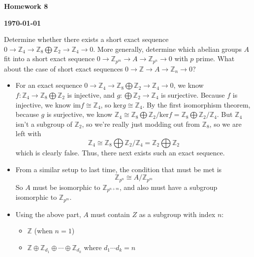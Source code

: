 \documentclass[12pt]{article}
\newcommand{\Z}{\mathbb{Z}}
\begin{document}
\begin{newtitle}
  \begin{center}
    \textbf{\Huge Homework 8}
  \end{center}
  \textbf{} \hfill \textbf{\today}
\end{newtitle}

\begin{statement}
  Determine whether there exists a short exact sequence $0 \to \Z_4 \to \Z_8 \bigoplus \Z_2 \to \Z_4 \to 0$.
  More generally, determine which abelian groups $A$ fit into a short exact sequence 
  $0 \to \Z_{p^m} \to A \to \Z_{p^n} \to 0$ with $p$ prime. What about the case of short exact 
  sequences $0 \to \Z \to A \to \Z_n \to 0$?
\end{statement}
\begin{newproof}
    \begin{itemize}
        \item For an exact sequence $0 \to \Z_4 \to \Z_8 \bigoplus \Z_2 \to \Z_4 \to 0$, we know $f: \Z_4 \to \Z_8 \bigoplus \Z_2$ is injective, and $g: \bigoplus \Z_2 \to \Z_4$ is surjective. Because $f$ is injective, we know im$f \cong \Z_4$, so ker$g \cong  \Z_4$. By the first isomorphism theorem, because $g$ is surjective, we know $\Z_4 \cong \Z_8 \bigoplus \Z_2 / \text{ker}f = \Z_8 \bigoplus \Z_2 / \Z_4$. But $\Z_4$ isn't a subgroup of $\Z_2$, so we're really just modding out from $\Z_8$, so we are left with 
        $$ \Z_4 \cong \Z_8 \bigoplus \Z_2 / \Z_4 =  \Z_2 \bigoplus \Z_2$$
        which is clearly false. Thus, there next exists such an exact sequence. 
        \item From a similar setup to last time, the condition that must be met is 
        $$\Z_{p^n} \cong A / \Z_{p^m}$$
        So $A$ must be isomorphic to $\Z_{p^{n+m}}$, and also must have a subgroup isomorphic to $\Z_{p^m}$.
        \item Using the above part, $A$ must contain $Z$ as a subgroup with index $n$:
            \begin{itemize}
                \item $\Z$ (when $n=1$)
                \item $\Z \oplus \Z_{d_1} \oplus \cdots \oplus \Z_{d_k}$ where $d_1 \cdots d_k = n$
            \end{itemize}
    \end{itemize}
\end{newproof}
\end{document}
